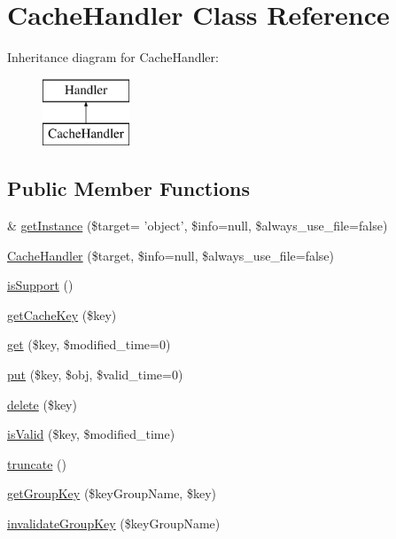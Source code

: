 \hypertarget{classCacheHandler}{\section{Cache\+Handler Class Reference}
\label{classCacheHandler}
}
Inheritance diagram for Cache\+Handler\+:\begin{figure}[H]
\begin{center}
\leavevmode
\includegraphics[height=2.000000cm]{classCacheHandler}
\end{center}
\end{figure}
\subsection*{Public Member Functions}
\begin{DoxyCompactItemize}
\item 
\& \hyperlink{classCacheHandler_a2fce85cb82ab180ce9d6bcea61a54eec}{get\+Instance} (\$target= 'object', \$info=null, \$always\+\_\+use\+\_\+file=false)
\item 
\hyperlink{classCacheHandler_a71cb13c8791b73a8153fd5bbc7aba3e3}{Cache\+Handler} (\$target, \$info=null, \$always\+\_\+use\+\_\+file=false)
\item 
\hyperlink{classCacheHandler_a4c137721670e0e9ce1d60bdd2f7235bb}{is\+Support} ()
\item 
\hyperlink{classCacheHandler_ab849392ce5ea0d57208f39d8a6a4fa43}{get\+Cache\+Key} (\$key)
\item 
\hyperlink{classCacheHandler_af726ae7803e5a73dee47bb43fc1fb8fc}{get} (\$key, \$modified\+\_\+time=0)
\item 
\hyperlink{classCacheHandler_af7fe9532fb10504cee980d7581a31995}{put} (\$key, \$obj, \$valid\+\_\+time=0)
\item 
\hyperlink{classCacheHandler_af51c1473c877ab5e20336d0d719c27d7}{delete} (\$key)
\item 
\hyperlink{classCacheHandler_aea9da5e2293a9062bc7a5f0a4104c9ce}{is\+Valid} (\$key, \$modified\+\_\+time)
\item 
\hyperlink{classCacheHandler_a10046e23ee8c8ef41bbbb69b2dda7889}{truncate} ()
\item 
\hyperlink{classCacheHandler_ab777b6b22477848324a25346da869596}{get\+Group\+Key} (\$key\+Group\+Name, \$key)
\item 
\hyperlink{classCacheHandler_a43118f91508ad5695a13f7a332cc9389}{invalidate\+Group\+Key} (\$key\+Group\+Name)
\end{DoxyCompactItemize}
